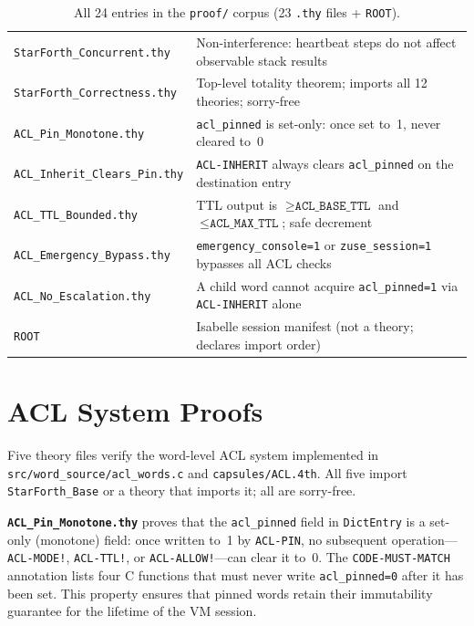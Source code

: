 \begin{table}[ht]
\begin{tabular}{ll}
\texttt{StarForth\_Concurrent.thy}
  & Non-interference: heartbeat steps do not affect observable stack results \\
\texttt{StarForth\_Correctness.thy}
  & Top-level totality theorem; imports all 12 theories; sorry-free \\
\texttt{ACL\_Pin\_Monotone.thy}
  & \texttt{acl\_pinned} is set-only: once set to~1, never cleared to~0 \\
\texttt{ACL\_Inherit\_Clears\_Pin.thy}
  & \texttt{ACL-INHERIT} always clears \texttt{acl\_pinned} on the destination entry \\
\texttt{ACL\_TTL\_Bounded.thy}
  & TTL output is $\ge \texttt{ACL\_BASE\_TTL}$ and $\le \texttt{ACL\_MAX\_TTL}$; safe decrement \\
\texttt{ACL\_Emergency\_Bypass.thy}
  & \texttt{emergency\_console=1} or \texttt{zuse\_session=1} bypasses all ACL checks \\
\texttt{ACL\_No\_Escalation.thy}
  & A child word cannot acquire \texttt{acl\_pinned=1} via \texttt{ACL-INHERIT} alone \\
\texttt{ROOT}
  & Isabelle session manifest (not a theory; declares import order) \\
\bottomrule
\end{tabular}
\caption{All 24 entries in the \texttt{proof/} corpus (23 \texttt{.thy} files + \texttt{ROOT}).}
\label{vol1:tab:proofs:all}
\end{table}

\section{ACL System Proofs}
\label{vol1:sec:proofs:acl}


Five theory files verify the word-level ACL system implemented in
\texttt{src/word\_source/acl\_words.c} and \texttt{capsules/ACL.4th}.
All five import \texttt{StarForth\_Base} or a theory that imports it; all are
sorry-free.

\textbf{\texttt{ACL\_Pin\_Monotone.thy}} proves that the \texttt{acl\_pinned}
field in \texttt{DictEntry} is a set-only (monotone) field: once written to~1
by \texttt{ACL-PIN}, no subsequent operation---\texttt{ACL-MODE!},
\texttt{ACL-TTL!}, or \texttt{ACL-ALLOW!}---can clear it to~0. The
\texttt{CODE-MUST-MATCH} annotation lists four C functions that must never
write \texttt{acl\_pinned=0} after it has been set. This property ensures that
pinned words retain their immutability guarantee for the lifetime of the VM
session.

